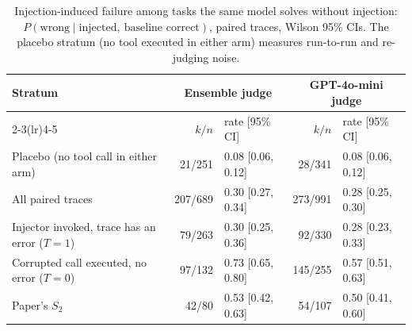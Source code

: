 \begin{table}[t]
\centering
\small
\caption{Injection-induced failure among tasks the same model solves without injection: $P(\text{wrong}\mid\text{injected},\ \text{baseline correct})$, paired traces, Wilson 95\% CIs. The placebo stratum (no tool executed in either arm) measures run-to-run and re-judging noise.}
\label{tab:flip}
\begin{tabular}{l r l r l}
\toprule
Stratum & \multicolumn{2}{c}{Ensemble judge} & \multicolumn{2}{c}{GPT-4o-mini judge} \\
\cmidrule(lr){2-3}\cmidrule(lr){4-5}
 & $k/n$ & rate [95\% CI] & $k/n$ & rate [95\% CI] \\
\midrule
Placebo (no tool call in either arm) & 21/251 & 0.08 [0.06, 0.12] & 28/341 & 0.08 [0.06, 0.12] \\
All paired traces & 207/689 & 0.30 [0.27, 0.34] & 273/991 & 0.28 [0.25, 0.30] \\
Injector invoked, trace has an error ($T{=}1$) & 79/263 & 0.30 [0.25, 0.36] & 92/330 & 0.28 [0.23, 0.33] \\
Corrupted call executed, no error ($T{=}0$) & 97/132 & 0.73 [0.65, 0.80] & 145/255 & 0.57 [0.51, 0.63] \\
Paper's $S_2$ & 42/80 & 0.53 [0.42, 0.63] & 54/107 & 0.50 [0.41, 0.60] \\
\bottomrule
\end{tabular}
\end{table}
